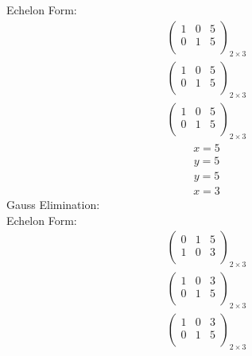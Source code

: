 \documentclass{article}
\begin{document}
Echelon Form:\\
\begin{align*}
\left(
\begin{array}{cc|c}
1 & 0 & 5\\
0 & 1 & 5\\
\end{array}
\right)_{2\times 3}
\end{align*}
\begin{align*}
\left(
\begin{array}{cc|c}
1 & 0 & 5\\
0 & 1 & 5\\
\end{array}
\right)_{2\times 3}
\end{align*}
\begin{align*}
\left(
\begin{array}{cc|c}
1 & 0 & 5\\
0 & 1 & 5\\
\end{array}
\right)_{2\times 3}
\end{align*}
\begin{align*}
x=5\end{align*}
\begin{align*}
y=5\end{align*}
\begin{align*}
y=5\end{align*}
\begin{align*}
x=3\end{align*}
Gauss Elimination:\\
Echelon Form:\\
\begin{align*}
\left(
\begin{array}{cc|c}
0 & 1 & 5\\
1 & 0 & 3\\
\end{array}
\right)_{2\times 3}
\end{align*}
\begin{align*}
\left(
\begin{array}{cc|c}
1 & 0 & 3\\
0 & 1 & 5\\
\end{array}
\right)_{2\times 3}
\end{align*}
\begin{align*}
\left(
\begin{array}{cc|c}
1 & 0 & 3\\
0 & 1 & 5\\
\end{array}
\right)_{2\times 3}
\end{align*}
\end{document}
